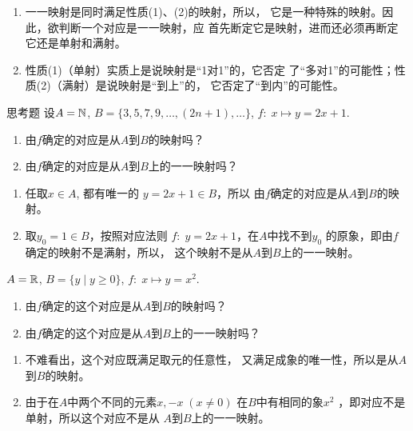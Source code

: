 \begin{note}
\begin{enumerate}
    \item 一一映射是同时满足性质(1)、(2)的映射，所以，
    它是一种特殊的映射。因此，欲判断一个对应是一一映射，应
    首先断定它是映射，进而还必须再断定它还是单射和满射。
    \item 性质(1)（单射）实质上是说映射是“1对1”的，它否定
    了“多对1”的可能性；性质(2)（满射）是说映射是“到上”的，
    它否定了“到内”的可能性。
\end{enumerate}
\end{note}

\begin{thm}{思考题}
    设$A=\mathbb{N}$, $B=\{3, 5,7,9,\ldots,(2n+1),\ldots\}$, $f:
   \; x\mapsto  y=2x+1$.
\begin{enumerate}[(1)]
    \item 由$f$确定的对应是从$A$到$B$的映射吗？
    \item 由$f$确定的对应是从$A$到$B$上的一一映射吗？
\end{enumerate}
\end{thm}


\begin{solution}
 \begin{enumerate}[(1)]
    \item 任取$x\in A$, 都有唯一的
$y=2x+1\in B$，所以
由$f$确定的对应是从$A$到$B$的映射。
\item 取$y_0=1\in B$，按照对应法则
$f:\; y=2x+1$，在$A$中找不到$y_0$
的原象，即由$f$确定的映射不是满射，所以，
这个映射不是从$A$到$B$上的一一映射。
 \end{enumerate}   
\end{solution}

\begin{example}
    $A=\mathbb{R}$, $B=\{y\mid y\ge 0\}$, $f:\;x\mapsto  y=x^2$.
\begin{enumerate}[(1)]
\item 由$f$确定的这个对应是从$A$到$B$的映射吗？
\item 由$f$确定的这个对应是从$A$到$B$上的一一映射吗？
\end{enumerate}
\end{example}

\begin{solution}
\begin{enumerate}[(1)]
    \item 不难看出，这个对应既满足取元的任意性，
    又满足成象的唯一性，所以是从$A$到$B$的映射。
    \item 由于在$A$中两个不同的元素$x,-x\; (x\ne 0)$
    在$B$中有相同的象$x^2$
    ，即对应不是单射，所以这个对应不是从
    $A$到$B$上的一一映射。
\end{enumerate}

\end{solution}

